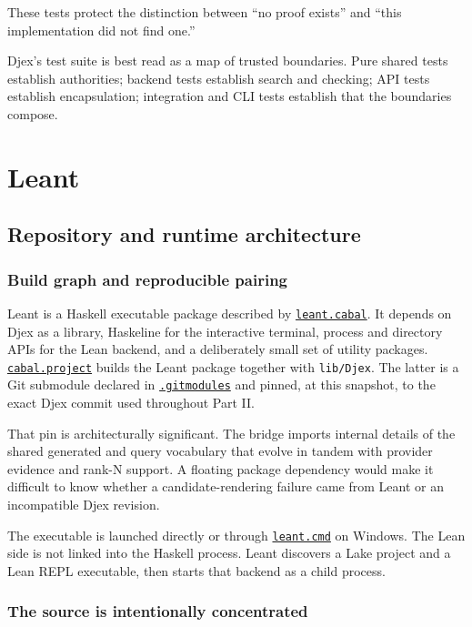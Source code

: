 \documentclass[10pt,letterpaper,oneside]{report}
\newcommand{\filepath}[1]{\nolinkurl{#1}}
\def\LeantBase{https://github.com/VladimirReshetnikov/Leant/blob/ada69d884480b93e74ee4b3daf77be38702ee07d/}
\newcommand{\lpath}[1]{\href{\LeantBase#1}{\nolinkurl{#1}}}
\begin{document}
These tests protect the distinction between ``no proof exists'' and ``this implementation did not find one.''

\begin{summarybox}
Djex's test suite is best read as a map of trusted boundaries. Pure shared tests establish authorities; backend tests establish search and checking; API tests establish encapsulation; integration and CLI tests establish that the boundaries compose.
\end{summarybox}

\part{Leant}

\chapter{Repository and runtime architecture}\label{ch:leant-model}

\section{Build graph and reproducible pairing}

Leant is a Haskell executable package described by \lpath{leant.cabal}. It depends on Djex as a library, Haskeline for the interactive terminal, process and directory APIs for the Lean backend, and a deliberately small set of utility packages. \lpath{cabal.project} builds the Leant package together with \filepath{lib/Djex}. The latter is a Git submodule declared in \lpath{.gitmodules} and pinned, at this snapshot, to the exact Djex commit used throughout Part II.

That pin is architecturally significant. The bridge imports internal details of the shared generated and query vocabulary that evolve in tandem with provider evidence and rank-N support. A floating package dependency would make it difficult to know whether a candidate-rendering failure came from Leant or an incompatible Djex revision.

The executable is launched directly or through \lpath{leant.cmd} on Windows. The Lean side is not linked into the Haskell process. Leant discovers a Lake project and a Lean REPL executable, then starts that backend as a child process.

\section{The source is intentionally concentrated}
\end{document}
